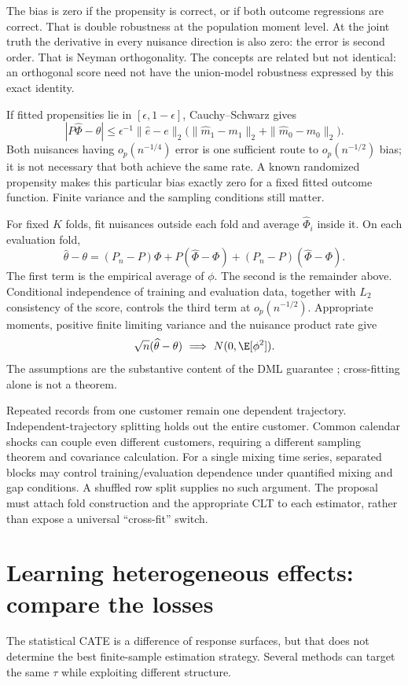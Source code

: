 The bias is zero if the propensity is correct, or if both outcome
regressions are correct. That is double robustness at the population
moment level. At the joint truth the derivative in every nuisance
direction is also zero: the error is second order. That is Neyman
orthogonality. The concepts are related but not identical: an orthogonal
score need not have the union-model robustness expressed by this exact
identity.

If fitted propensities lie in $[\epsilon,1-\epsilon]$,
Cauchy--Schwarz gives
\[
 |P\widehat\Phi-\theta|
 \le\epsilon^{-1}\|\widehat e-e\|_2
       \bigl(\|\widehat m_1-m_1\|_2+
             \|\widehat m_0-m_0\|_2\bigr).
\]
Both nuisances having $o_p(n^{-1/4})$ error is one sufficient route to
$o_p(n^{-1/2})$ bias; it is not necessary that both achieve the same
rate. A known randomized propensity makes this particular bias exactly
zero for a fixed fitted outcome function. Finite variance and the
sampling conditions still matter.

For fixed $K$ folds, fit nuisances outside each fold and average
$\widehat\Phi_i$ inside it. On each evaluation fold,
\[
 \widehat\theta-\theta
 =(P_n-P)\Phi+P(\widehat\Phi-\Phi)
                  +(P_n-P)(\widehat\Phi-\Phi).
\]
The first term is the empirical average of $\phi$. The second is the
remainder above. Conditional independence of training and evaluation
data, together with $L_2$ consistency of the score, controls the third
term at $o_p(n^{-1/2})$. Appropriate moments, positive finite limiting
variance and the nuisance product rate give
\[
 \sqrt n(\widehat\theta-\theta)\ \Longrightarrow\
 N(0,\E[\phi^2]).
\]
The assumptions are the substantive content of the DML guarantee
\citep[Assumption 5.1 and Theorem 5.1]{dml2018}; cross-fitting alone
is not a theorem.

Repeated records from one customer remain one dependent trajectory.
Independent-trajectory splitting holds out the entire customer. Common
calendar shocks can couple even different customers, requiring a different
sampling theorem and covariance calculation. For a single mixing time
series, separated blocks may control training/evaluation dependence under
quantified mixing and gap conditions. A shuffled row split supplies no
such argument. The proposal must attach fold construction and the
appropriate CLT to each estimator, rather than expose a universal
``cross-fit'' switch.

\section{Learning heterogeneous effects: compare the losses}
\label{r3:heterogeneity}
The statistical CATE is a difference of response surfaces, but that does
not determine the best finite-sample estimation strategy. Several methods
can target the same $\tau$ while exploiting different structure.

